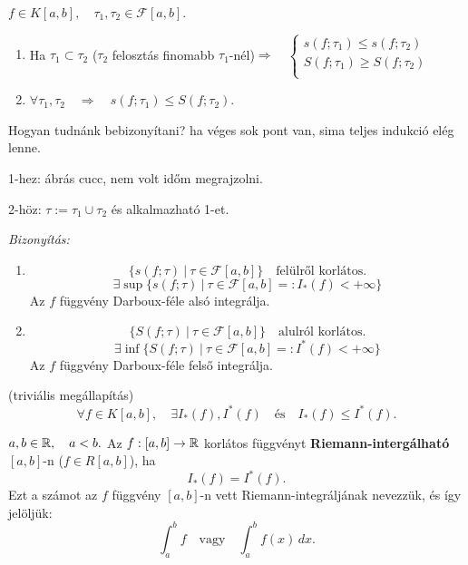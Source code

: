 \documentclass[a4paper,11.5pt]{article}
\begin{document}
	\begin{theorem}
		$f\in K[a,b],\quad \tau_1,\tau_2\in\mathcal{F}[a,b].$
		\begin{enumerate}
			\item Ha $\tau_1\subset\tau_2$ ($\tau_2$ felosztás finomabb $\tau_1$-nél)\quad $\Rightarrow\quad \left\{
			\begin{gathered}
				s(f;\tau_1)\leq s(f;\tau_2)\\
				S(f;\tau_1)\geq S(f;\tau_2)\\
			\end{gathered}\right.$
			\item $\forall \tau_1,\tau_2\quad \Rightarrow\quad s(f;\tau_1)\leq S(f;\tau_2)$.
		\end{enumerate}
		\begin{note}
			Hogyan tudnánk bebizonyítani? ha véges sok pont van, sima teljes indukció elég lenne.
		\end{note}
		\begin{note}
			1-hez: ábrás cucc, nem volt időm megrajzolni.
			
			2-höz: $\tau:=\tau_1\cup \tau_2$ és alkalmazható 1-et.
		\end{note}
		\textit{Bizonyítás:}
		\begin{enumerate}
			\item \[ \{ s(f;\tau)\ | \ \tau\in\mathcal{F}[a,b] \}\quad \text{felülről korlátos.} \]
			\[ \exists\sup\{ s(f;\tau)\ | \ \tau\in\mathcal{F}[a,b]=:I_*(f)<+\infty \} \]
			Az $f$ függvény Darboux-féle alsó integrálja.
			\item \[ \{ S(f;\tau)\ | \ \tau\in\mathcal{F}[a,b] \}\quad \text{alulról korlátos.} \]
			\[ \exists\inf\{ S(f;\tau)\ | \ \tau\in\mathcal{F}[a,b]=:I^*(f)<+\infty \} \] 
			Az $f$ függvény Darboux-féle felső integrálja.
		\end{enumerate}
	\end{theorem}
	\begin{theorem} (triviális megállapítás)
		\[ \forall f\in K[a,b],\quad \exists I_*(f), I^*(f)\quad \text{és}\quad I_*(f)\leq I^*(f). \]
	\end{theorem}
	\begin{definition}
		$a,b\in\mathbb{R},\quad a<b.$ Az $f:[a,b]\to\mathbb{R}$ korlátos függvényt \textbf{Riemann-intergálható} $[a,b]$-n ($f\in R[a,b]$), ha 
		\[ I_*(f)=I^*(f). \]
		Ezt a számot az $f$ függvény $[a,b]$-n vett Riemann-integráljának nevezzük, és így jelöljük:
		\[ \int_a^bf\quad \text{vagy}\quad \int_a^bf(x)\, dx. \]
	\end{definition}
\end{document}
